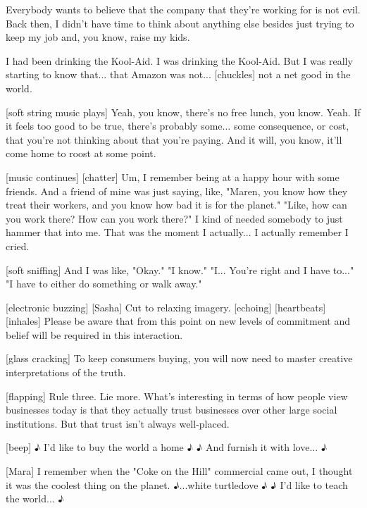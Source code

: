 \documentclass[a4paper]{article}
\begin{document}
	
	Everybody wants to believe that the company that they're working for is not evil.
	Back then, I didn't have time to think about anything else besides just trying to keep my job and, you know, raise my kids.
	
	
	I had been drinking the Kool-Aid. I was drinking the Kool-Aid.
	But I was really starting to know that... that Amazon was not... [chuckles] not a net good in the world.
	
	
	[soft string music plays]
	Yeah, you know, there's no free lunch, you know. Yeah.
	If it feels too good to be true, there's probably some... some consequence, or cost, that you're not thinking about that you're paying. And it will, you know, it'll come home to roost at some point.
	
	
	[music continues]
	[chatter]
	Um, I remember being at a happy hour with some friends.
	And a friend of mine was just saying, like, "Maren, you know how they treat their workers, and you know how bad it is for the planet."
	"Like, how can you work there? How can you work there?"
	I kind of needed somebody to just hammer that into me.
	That was the moment I actually... I actually remember I cried.
	
	
	[soft sniffing]
	And I was like, "Okay."
	"I know."
	"I... You're right and I have to..."
	"I have to either do something or walk away."
	
	
	
	[electronic buzzing]
	[Sasha] Cut to relaxing imagery. [echoing]
	[heartbeats]
	[inhales]
	Please be aware that from this point on new levels of commitment and belief will be required in this interaction.
	
	
	
	[glass cracking]
	To keep consumers buying, you will now need to master creative interpretations of the truth.
	
	
	
	[flapping]
	Rule three. Lie more.
	What's interesting in terms of how people view businesses today is that they actually trust businesses over other large social institutions.
	But that trust isn't always well-placed.
	
	
	
	[beep]
	♪ I'd like to buy the world a home ♪
	♪ And furnish it with love... ♪
	
	
	
	[Mara] I remember when the "Coke on the Hill" commercial came out,
	I thought it was the coolest thing on the planet.
	♪...white turtledove ♪
	♪ I'd like to teach the world... ♪
	
\end{document}
